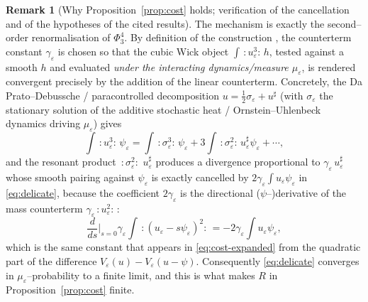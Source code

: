 \documentclass[12pt]{article}
\theoremstyle{definition}
\newtheorem{remark}{Remark}
\newcommand{\Wick}[1]{\,{:}#1{:}\,}
\begin{document}
\begin{remark}[Why Proposition~\ref{prop:cost} holds; verification of the cancellation and
of the hypotheses of the cited results]
The mechanism is exactly the second--order renormalisation of $\Phi^4_3$. By definition of
the construction \cite{BG,GH}, the counterterm constant $\gamma_\varepsilon$ is chosen so
that the cubic Wick object $\int\Wick{u_\varepsilon^3}h$, tested against a smooth $h$ and
evaluated \emph{under the interacting dynamics/measure $\mu_\varepsilon$}, is rendered
convergent precisely by the addition of the linear counterterm. Concretely, the Da
Prato--Debussche / paracontrolled decomposition $u=\tfrac12\sigma_\varepsilon+u^\sharp$
(with $\sigma_\varepsilon$ the stationary solution of the additive stochastic heat /
Ornstein--Uhlenbeck dynamics driving $\mu_\varepsilon$) gives
\[
  \int\Wick{u_\varepsilon^3}\psi_\varepsilon
  =\int\Wick{\sigma_\varepsilon^3}\psi_\varepsilon
   +3\int\Wick{\sigma_\varepsilon^2}u^\sharp_\varepsilon\psi_\varepsilon+\cdots,
\]
and the resonant product $\Wick{\sigma_\varepsilon^2}\,u^\sharp_\varepsilon$ produces a
divergence proportional to $\gamma_\varepsilon\,u^\sharp_\varepsilon$ whose smooth pairing
against $\psi_\varepsilon$ is exactly cancelled by $2\gamma_\varepsilon\int u_\varepsilon\psi_\varepsilon$
in \eqref{eq:delicate}, because the coefficient $2\gamma_\varepsilon$ is the directional
($\psi$--)derivative of the mass counterterm $\gamma_\varepsilon\Wick{u_\varepsilon^2}$:
\[
  \frac{d}{ds}\Big|_{s=0}\gamma_\varepsilon\!\int\Wick{(u_\varepsilon-s\psi_\varepsilon)^2}
  =-2\gamma_\varepsilon\!\int u_\varepsilon\psi_\varepsilon ,
\]
which is the same constant that appears in \eqref{eq:cost-expanded} from the quadratic part
of the difference $V_\varepsilon(u)-V_\varepsilon(u-\psi)$. Consequently
\eqref{eq:delicate} converges in $\mu_\varepsilon$--probability to a finite limit, and this
is what makes $R$ in Proposition~\ref{prop:cost} finite.


\end{remark}
\end{document}
